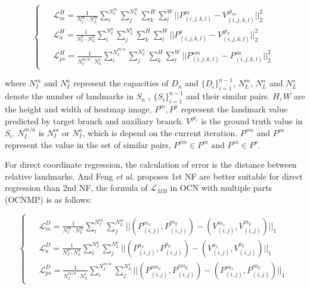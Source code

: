 \documentclass[journal,transmag]{IEEEtran}
\begin{document}
\begin{equation}
\begin{cases}
\begin{split}
&\mathcal{L}_{m}^{H} = \frac{1}{N_{I}^{m} \cdot N_{L}^{m}}  \sum_{i}^{N_{I}^{m}}\sum_{j}^{N_L^m}\sum_k^H\sum_l^W || P_{(i,j,k,l)}^m - V_{(i,j,k,l)}^{gt_m} ||_2^2  \\ 
&\mathcal{L}_{a}^{H} = \frac{1}{N_{I}^{a} \cdot N_{L}^{a}} \sum_{i}^{N_{I}^{a}}\sum_{j}^{N_L^a}\sum_k^H\sum_l^W || P_{(i,j,k,l)}^a - V_{(i,j,k,l)}^{gt_a} ||_2^2  \\ 
&\mathcal{L}_{ps}^{H} =\frac{1}{N_{I}^{m/a} \cdot N_{L}^{s}} \sum_{i}^{N_{I}^{m/a}}\sum_{j}^{N_L^s}\sum_k^H\sum_l^W || P_{(i,j,k,l)}^{sm} - P_{(i,j,k,l)}^{sa} ||_2^2
\end{split}
\end{cases}
\end{equation}

where $N_I^m$ and $N_I^a$ represent the capacities of $D_n$ and $\{D_i\}_{i=1}^{n-1}$,
$N_L^m$, $N_L^a$ and $N_L^s$ denote the number of landmarks in $S_n$ , $\{S_i\}_{i=1}^{n-1}$ and their similar pairs.
$H,W$ are the height and width of heatmap image, $P^m,P^a$ represent the landmark value predicted by target branch and auxiliary branch.
$V^{gt_i}$ is the ground truth value in $S_i$.
$N_{I}^{m/a}$ is $N_I^m$ or $N_I^a$, which is depend on the current iteration.
$P^{sm} \text{ and } P^{sa}$ represent the value in the set of similar pairs, $P^{sm} \in P^{m} \text{ and } P^{sa} \in P^{a} $. 

For direct coordinate regression, the calculation of error is the distance between relative landmarks,
And Feng \emph{et al.}  \cite{feng2018wing} proposes 1st NF are better suitable for direct regression than 2nd NF, the formula of $\mathcal{L}_{MB}$ in OCN with multiple parts (OCNMP) is as follows:

\begin{equation}
\begin{cases}
\begin{split}
&\mathcal{L}_{m}^{D} = \frac{1}{N_{I}^{m} \cdot N_{L}^{m}} \sum_{i}^{N_{I}^{m}}\sum_{j}^{N_L^m} || (P_{(i,j)}^{m_x},P_{(i,j)}^{m_y}) - (V_{(i,j)}^{m_x},V_{(i,j)}^{m_y})||_{1} \\ 
&\mathcal{L}_{a}^{D} =\frac{1}{N_{I}^{a} \cdot N_{L}^{a}} \sum_{i}^{N_{I}^{a}}\sum_{j}^{N_L^a} || (P_{(i,j)}^{a_x},P_{(i,j)}^{a_y}) - (V_{(i,j)}^{a_x},V_{(i,j)}^{a_y})||_{1} \\
&\mathcal{L}_{ps}^{D} = \frac{1}{N_{I}^{m/a} \cdot N_{L}^{s}} \sum_{i}^{N_{I}^{m/a}}\sum_{j}^{N_L^s} || (P_{(i,j)}^{sm_x},P_{(i,j)}^{sm_y} ) - (P_{(i,j)}^{sa_x},P_{(i,j)}^{sa_y})||_{1}
\end{split}
\end{cases}
\end{equation}
\end{document}
